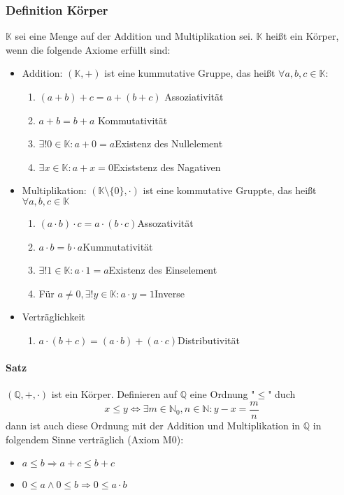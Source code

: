 \documentclass[a4paper]{scrartcl}
\DeclareMathOperator{\Forall}{\forall}%
\begin{document}
\subsubsection{Definition Körper}
\label{sec-2-4-3}
$\mathbb{K}$ sei eine Menge auf der Addition und Multiplikation sei. $\mathbb{K}$ heißt ein Körper, wenn die folgende Axiome erfüllt sind:
\begin{itemize}
\item Addition: $(\mathbb{K}, +)$ ist eine kummutative Gruppe, das heißt $\Forall a,b,c\in \mathbb{K}$:
\begin{enumerate}
\item \((a+b)+c = a+(b+c)\) \hfill Assoziativität
\item \(a+b = b+a\) \hfill Kommutativität
\item \(\exists! 0\in\mathbb{K}:a+0 = a\)\hfill Existenz des Nullelement
\item \(\exists x\in\mathbb{K}: a+x = 0\)\hfill Existstenz des Nagativen
\end{enumerate}
\item Multiplikation: $(\mathbb{K}\setminus\{0\},\cdot)$ ist eine kommutative Gruppte, das heißt $\Forall a,b,c\in\mathbb{K}$
\begin{enumerate}
\item \((a\cdot b)\cdot c = a\cdot(b\cdot c)\)\hfill Assozativität
\item \(a\cdot b = b\cdot a\)\hfill Kummutativität
\item \(\exists!1\in\mathbb{K}:a\cdot 1 = a\)\hfill Existenz des Einselement
\item Für \(a\neq 0, \exists! y\in\mathbb{K}:a\cdot y = 1\)\hfill Inverse
\end{enumerate}
\item Verträglichkeit
\begin{enumerate}
\item \(a\cdot (b + c) = (a\cdot b)+ (a\cdot c)\)\hfill Distributivität
\end{enumerate}
\end{itemize}
\paragraph{Satz}
\label{sec-2-4-3-1}
$(\mathbb{Q},+,\cdot)$ ist ein Körper. Definieren auf $\mathbb{Q}$ eine Ordnung "$\leq$" duch \[x\leq y \Leftrightarrow\exists m\in\mathbb{N}_0, n\in\mathbb{N}:y - x = \frac{m}{n}\]
dann ist auch diese Ordnung mit der Addition und Multiplikation in $\mathbb{Q}$ in folgendem Sinne verträglich (Axiom M0):
\begin{itemize}
\item \(a\leq b\Rightarrow a+c \leq b + c\)
\item \(0\leq a\wedge 0\leq b \Rightarrow 0\leq a\cdot b\)
\end{itemize}
\end{document}
